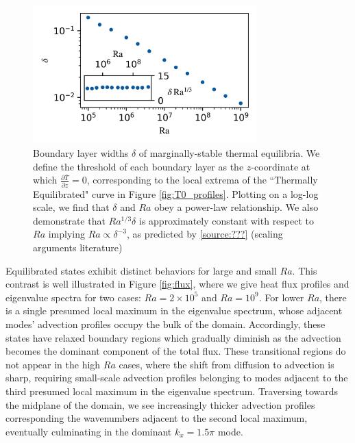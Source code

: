 \documentclass[reprint,amsmath,amssymb,aps]{revtex4-1}
\begin{document}
\begin{figure}[h]
    \centering
    \includegraphics[width=3.4in]{del_ra.PNG}
    \caption{Boundary layer widths $\delta$ of marginally-stable thermal equilibria. We define the threshold of each boundary layer as the $z$-coordinate at which $\frac{\partial \bar{T}}{\partial z} = 0$, corresponding to the local extrema of the ``Thermally Equilibrated" curve in Figure \ref{fig:T0_profiles}. Plotting on a log-log scale, we find that $\delta$ and $Ra$ obey a power-law relationship. We also demonstrate that $Ra^{1/3}\delta$ is approximately constant with respect to $Ra$ implying $Ra \propto  \delta^{-3}$, as predicted by \ref{source:???} (scaling arguments literature)}
    \label{fig:bl_ra}
\end{figure}


Equilibrated states exhibit distinct behaviors for large and small $Ra$. This contrast is well illustrated in Figure \ref{fig:flux}, where we give heat flux profiles and eigenvalue spectra for two cases: $Ra = 2 \times 10^5$ and $Ra = 10^9$. For lower $Ra$, there is a single presumed local maximum in the eigenvalue spectrum, whose adjacent modes' advection profiles occupy the bulk of the domain. Accordingly, these states have relaxed boundary regions which gradually diminish as the advection becomes the dominant component of the total flux. These transitional regions do not appear in the high $Ra$ cases, where the shift from diffusion to advection is sharp, requiring small-scale advection profiles belonging to modes adjacent to the third presumed local maximum in the eigenvalue spectrum. Traversing towards the midplane of the domain, we see increasingly thicker advection profiles corresponding the wavenumbers adjacent to the second local maximum, eventually culminating in the dominant $k_x = 1.5\pi$ mode.
\end{document}
